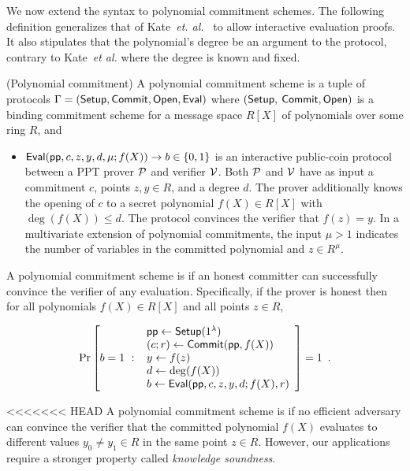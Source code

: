 We now extend the syntax to polynomial commitment schemes. The following definition generalizes that of Kate~\emph{et. al.}~\cite{AC:KatZavGol10} to allow interactive evaluation proofs. It also stipulates that the polynomial's degree be an argument to the protocol, contrary to Kate~\emph{et al.} where the degree is known and fixed.

\begin{definition} (Polynomial commitment) 
A polynomial commitment scheme is a tuple of protocols $\Gamma = (\textsf{{Setup}}, \textsf{{Commit}}, \textsf{{Open}}, \textsf{{Eval}})$ where $(\textsf{{Setup}},$ $\textsf{{Commit}}, \textsf{{Open}})$ is a binding commitment scheme for a message space $R[X]$ of polynomials over some ring $R$, and
\begin{itemize}
    \item $\textsf{{Eval}}(\textsf{pp}, c, z, y, d, \mu; f(X)) \rightarrow b \in \{0, 1\}$ is an interactive public-coin protocol between a PPT prover $\mathcal{P}$ and verifier $\mathcal{V}$. Both $\mathcal{P}$ and $\mathcal{V}$ have as input a commitment $c$, points $z, y \in R$, and a degree $d$. The prover additionally knows the opening of $c$ to a secret polynomial $f(X) \in R[X]$ with $\deg(f(X)) \leq d$. The protocol convinces the verifier that $f(z) = y$. {In a multivariate extension of polynomial commitments, the input $\mu > 1$ indicates the number of variables in the committed polynomial} and $z \in R^\mu$.
\end{itemize}

A polynomial commitment scheme is  if an honest committer can successfully convince the verifier of any evaluation. 
Specifically, if the prover is honest then for all polynomials $f(X) \in R[X]$ and all points $z \in R$,
\begin{small}
\[
    \Pr\left[b = 1 \ : \ \begin{array}{l}
        \textsf{pp} \gets \textsf{{Setup}}(1^\lambda) \\
        (c; r) \gets \textsf{{Commit}}(\textsf{pp}, f(X)) \\
        y \gets f(z) \\
        d \gets \deg(f(X)) \\
        b \gets \textsf{{Eval}}(\textsf{pp}, c, z, y, d; f(X), r) \\
    \end{array} \right] = 1 \enspace .
\]
\end{small}

<<<<<<< HEAD
A polynomial commitment scheme is  if no efficient adversary can convince the verifier that the committed polynomial $f(X)$ evaluates to different values $y_0 \neq y_1 \in R$ in the same point $z \in R$. However, our applications require a stronger property called \emph{knowledge soundness}. 


\end{definition}
